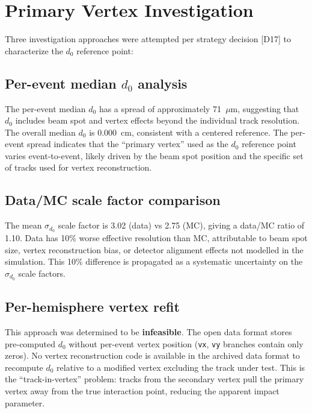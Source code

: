 \documentclass[11pt,a4paper]{article}
\begin{document}
\section{Primary Vertex Investigation}
\label{app:vertex}

Three investigation approaches were attempted per strategy decision [D17] to
characterize the $d_0$ reference point:

\subsection{Per-event median $d_0$ analysis}

The per-event median $d_0$ has a spread of approximately 71~$\mu$m, suggesting that
$d_0$ includes beam spot and vertex effects beyond the individual track resolution.
The overall median $d_0$ is 0.000~cm, consistent with a centered reference. The
per-event spread indicates that the ``primary vertex'' used as the $d_0$ reference
point varies event-to-event, likely driven by the beam spot position and the
specific set of tracks used for vertex reconstruction.

\subsection{Data/MC scale factor comparison}

The mean $\sigma_{d_0}$ scale factor is 3.02 (data) vs 2.75 (MC), giving a data/MC
ratio of 1.10. Data has 10\% worse effective resolution than MC, attributable to beam
spot size, vertex reconstruction bias, or detector alignment effects not modelled in the
simulation. This 10\% difference is propagated as a systematic uncertainty on the
$\sigma_{d_0}$ scale factors.

\subsection{Per-hemisphere vertex refit}

This approach was determined to be \textbf{infeasible}. The open data format stores
pre-computed $d_0$ without per-event vertex position (\texttt{vx}, \texttt{vy}
branches contain only zeros). No vertex reconstruction code is available in the
archived data format to recompute $d_0$ relative to a modified vertex excluding the
track under test. This is the ``track-in-vertex'' problem: tracks from the secondary
vertex pull the primary vertex away from the true interaction point, reducing the
apparent impact parameter.
\end{document}
